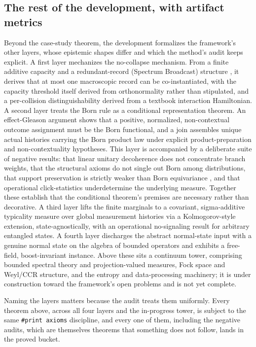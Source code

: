 \documentclass[11pt]{article}
\begin{document}
\subsection{The rest of the development, with artifact metrics}

Beyond the case-study theorem, the development formalizes the framework's other layers, whose epistemic
shapes differ and which the method's audit keeps explicit. A
first layer mechanizes the no-collapse mechanism. From a finite additive capacity and a
redundant-record (Spectrum Broadcast) structure \cite{r45}, it derives that at most one macroscopic record can
be co-instantiated, with the capacity threshold itself derived from orthonormality rather than
stipulated, and a per-collision distinguishability derived from a textbook interaction Hamiltonian.
A second layer treats the Born rule as a conditional representation theorem. An effect-Gleason
argument \cite{r35,r36} shows that a positive, normalized, non-contextual outcome assignment must be the Born
functional, and a join assembles unique actual histories carrying the Born product law under
explicit product-preparation and non-contextuality hypotheses. This layer is accompanied by a
deliberate suite of negative results: that linear unitary decoherence does not concentrate branch
weights, that the structural axioms do not single out Born among distributions, that support
preservation is strictly weaker than Born equivariance \cite{r37}, and that operational click-statistics
underdetermine the underlying measure. Together these establish that the conditional theorem's
premises are necessary rather than decorative. A third layer lifts the finite marginals to a
covariant, sigma-additive typicality measure over global measurement histories via a
Kolmogorov-style extension, state-agnostically, with an operational no-signaling result for
arbitrary entangled states. A fourth layer discharges the abstract normal-state input with a
genuine normal state on the algebra of bounded operators and exhibits a free-field, boost-invariant
instance. Above these sits a continuum tower, comprising bounded spectral theory and
projection-valued measures, Fock space and Weyl/CCR structure, and the entropy and data-processing
machinery; it is under construction toward the framework's open problems and is not yet complete.

Naming the layers matters because the audit treats them uniformly. Every theorem above, across all
four layers and the in-progress tower, is subject to the same \texttt{\#print axioms} discipline, and every
one of them, including the negative audits, which are themselves theorems that something does not
follow, lands in the proved bucket.
\end{document}
